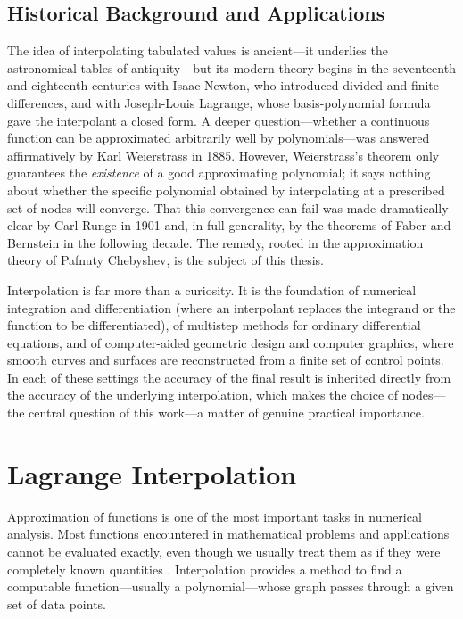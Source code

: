 \documentclass[12pt, a4paper]{article}
\theoremstyle{plain}
\theoremstyle{definition}
\theoremstyle{remark}
\begin{document}
\subsection{Historical Background and Applications}

The idea of interpolating tabulated values is ancient---it underlies the astronomical tables of antiquity---but its modern theory begins in the seventeenth and eighteenth centuries with Isaac Newton, who introduced divided and finite differences, and with Joseph-Louis Lagrange, whose basis-polynomial formula gave the interpolant a closed form. A deeper question---whether a continuous function can be approximated arbitrarily well by polynomials---was answered affirmatively by Karl Weierstrass in 1885. However, Weierstrass's theorem only guarantees the \emph{existence} of a good approximating polynomial; it says nothing about whether the specific polynomial obtained by interpolating at a prescribed set of nodes will converge. That this convergence can fail was made dramatically clear by Carl Runge in 1901 and, in full generality, by the theorems of Faber and Bernstein in the following decade. The remedy, rooted in the approximation theory of Pafnuty Chebyshev, is the subject of this thesis.

Interpolation is far more than a curiosity. It is the foundation of numerical integration and differentiation (where an interpolant replaces the integrand or the function to be differentiated), of multistep methods for ordinary differential equations, and of computer-aided geometric design and computer graphics, where smooth curves and surfaces are reconstructed from a finite set of control points. In each of these settings the accuracy of the final result is inherited directly from the accuracy of the underlying interpolation, which makes the choice of nodes---the central question of this work---a matter of genuine practical importance.


\newpage
\section{Lagrange Interpolation}

Approximation of functions is one of the most important tasks in numerical analysis. Most functions encountered in mathematical problems and applications cannot be evaluated exactly, even though we usually treat them as if they were completely known quantities \cite{micula4}. Interpolation provides a method to find a computable function---usually a polynomial---whose graph passes through a given set of data points.
\end{document}
